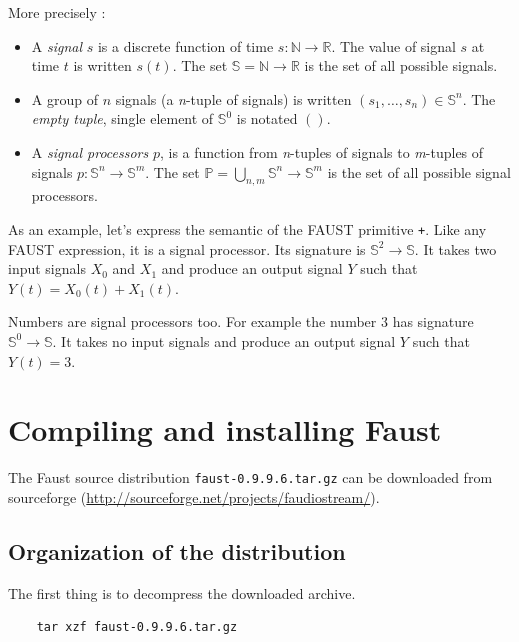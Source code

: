 \documentclass[a4paper]{book}
\begin{document}
More precisely :

\begin{itemize}

\item A \emph{signal} $s$ is a discrete function of time $s:\mathbb{N}\rightarrow\mathbb{R}$. 
The value of signal $s$ at time $t$ is written $s(t)$. 
The set $\mathbb{S}=\mathbb{N}\rightarrow\mathbb{R}$ is the set of all possible  signals.

\item A group of $n$ signals (a \emph{n}-tuple of signals) is written
$(s_{1},\ldots,s_{n})\in \mathbb{S}^{n}$.
The \emph{empty tuple}, single element of $\mathbb{S}^{0}$ is notated  $()$.

\item A \emph{signal processors} $p$, is a function from
\emph{n}-tuples of signals to \emph{m}-tuples of signals
$p:\mathbb{S}^{n}\rightarrow\mathbb{S}^{m}$. The set $\mathbb{P}=\bigcup_{n,m}\mathbb{S}^{n}\rightarrow\mathbb{S}^{m}$ is the
set of all possible signal processors.

\end{itemize}

As an example, let's express the semantic of the FAUST primitive \lstinline'+'. Like any FAUST expression, it is a signal processor. Its signature is $\mathbb{S}^{2}\rightarrow\mathbb{S}$. It takes two input signals $X_0$ and $X_1$ and produce an output signal $Y$ such that $Y(t) = X_0(t)+X_1(t)$. 

Numbers are signal processors too. For example the number $3$ has signature  $\mathbb{S}^{0}\rightarrow\mathbb{S}$.  It takes no input signals and produce an output signal $Y$ such that $Y(t) = 3$. 

\chapter{Compiling and installing Faust}

The Faust source distribution \lstinline'faust-0.9.9.6.tar.gz' can be downloaded from sourceforge (\url{http://sourceforge.net/projects/faudiostream/}).

\section{Organization of the distribution}
The first thing is to decompress the downloaded archive. 
\begin{lstlisting}
	tar xzf faust-0.9.9.6.tar.gz
\end{lstlisting}
\end{document}
